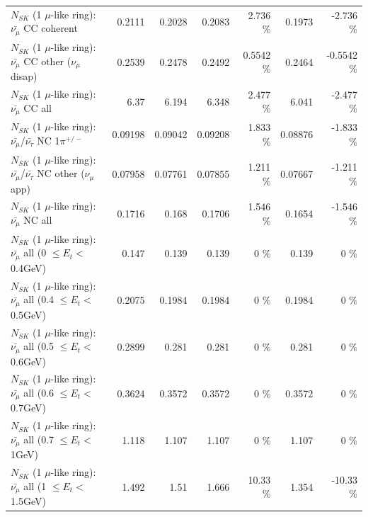 \begin{table}
\begin{tabular}{| l | r | r | r  r | r  r |}
                       $N_{SK}$ (1 $\mu$-like ring): $\bar{\nu_\mu}$ CC coherent &          0.2111 &          0.2028 &          0.2083 &    2.736 \%  &          0.1973 &   -2.736 \%  \\ 
        $N_{SK}$ (1 $\mu$-like ring): $\bar{\nu_\mu}$ CC other ($\nu_\mu$ disap) &          0.2539 &          0.2478 &          0.2492 &   0.5542 \%  &          0.2464 &  -0.5542 \%  \\ 
                          $N_{SK}$ (1 $\mu$-like ring): $\bar{\nu_{\mu}}$ CC all &            6.37 &           6.194 &           6.348 &    2.477 \%  &           6.041 &   -2.477 \%  \\ 
\hline
  $N_{SK}$ (1 $\mu$-like ring): $\bar{\nu_\mu}$/$\bar{\nu_\tau}$ NC 1$\pi^{+/-}$ &         0.09198 &         0.09042 &         0.09208 &    1.833 \%  &         0.08876 &   -1.833 \%  \\ 
$N_{SK}$ (1 $\mu$-like ring): $\bar{\nu_\mu}$/$\bar{\nu_\tau}$ NC other ($\nu_\mu$ app) &         0.07958 &         0.07761 &         0.07855 &    1.211 \%  &         0.07667 &   -1.211 \%  \\ 
                          $N_{SK}$ (1 $\mu$-like ring): $\bar{\nu_{\mu}}$ NC all &          0.1716 &           0.168 &          0.1706 &    1.546 \%  &          0.1654 &   -1.546 \%  \\ 
\hline
   $N_{SK}$ (1 $\mu$-like ring): $\bar{\nu_{\mu}}$ all (0 $\leq E_{t} <$ 0.4GeV) &           0.147 &           0.139 &           0.139 &        0 \%  &           0.139 &        0 \%  \\ 
 $N_{SK}$ (1 $\mu$-like ring): $\bar{\nu_{\mu}}$ all (0.4 $\leq E_{t} <$ 0.5GeV) &          0.2075 &          0.1984 &          0.1984 &        0 \%  &          0.1984 &        0 \%  \\ 
 $N_{SK}$ (1 $\mu$-like ring): $\bar{\nu_{\mu}}$ all (0.5 $\leq E_{t} <$ 0.6GeV) &          0.2899 &           0.281 &           0.281 &        0 \%  &           0.281 &        0 \%  \\ 
 $N_{SK}$ (1 $\mu$-like ring): $\bar{\nu_{\mu}}$ all (0.6 $\leq E_{t} <$ 0.7GeV) &          0.3624 &          0.3572 &          0.3572 &        0 \%  &          0.3572 &        0 \%  \\ 
   $N_{SK}$ (1 $\mu$-like ring): $\bar{\nu_{\mu}}$ all (0.7 $\leq E_{t} <$ 1GeV) &           1.118 &           1.107 &           1.107 &        0 \%  &           1.107 &        0 \%  \\ 
   $N_{SK}$ (1 $\mu$-like ring): $\bar{\nu_{\mu}}$ all (1 $\leq E_{t} <$ 1.5GeV) &           1.492 &            1.51 &           1.666 &    10.33 \%  &           1.354 &   -10.33 \%  \\ 

\end{tabular}
\end{table}
